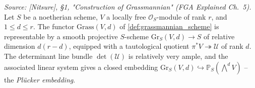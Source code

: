 \begin{theorem}
  \textit{Source: [Nitsure], \S 1, "Construction of Grassmannian" (FGA
  Explained Ch.~5).}
  Let \(S\) be a noetherian scheme, \(V\) a locally free \(\mathcal{O}_S\)-module
  of rank \(r\), and \(1 \le d \le r\). The functor \(\mathrm{Grass}(V,d)\) of
  \cref{def:grassmannian_scheme} is representable by a smooth projective
  \(S\)-scheme \(\mathrm{Gr}_S(V, d) \to S\) of relative dimension \(d(r-d)\),
  equipped with a tautological quotient
  \(\pi^* V \twoheadrightarrow \mathcal{U}\) of rank \(d\). The determinant
  line bundle \(\det(\mathcal{U})\) is relatively very ample, and the
  associated linear system gives a closed embedding
  \(\mathrm{Gr}_S(V, d) \hookrightarrow
  \mathbb{P}_S\!\left(\bigwedge^d V\right)\) -- the \emph{Pl\"ucker embedding}.

\end{theorem}

